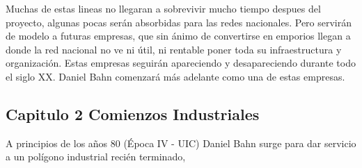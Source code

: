 Muchas de estas lineas no llegaran a sobrevivir mucho tiempo despues del proyecto, algunas pocas
serán absorbidas para las redes nacionales. Pero servirán de modelo a futuras empresas, que sin
ánimo de convertirse en emporios llegan a donde la red nacional no ve ni útil, ni rentable poner
toda su infraestructura y organización. Estas empresas seguirán apareciendo y desapareciendo
durante todo el siglo XX.  Daniel Bahn comenzará más adelante como una de estas empresas.

\subsection{Capitulo 2 Comienzos Industriales}
A principios de los años 80 (Época IV - UIC) Daniel Bahn surge para dar servicio a un polígono
industrial recién terminado,  